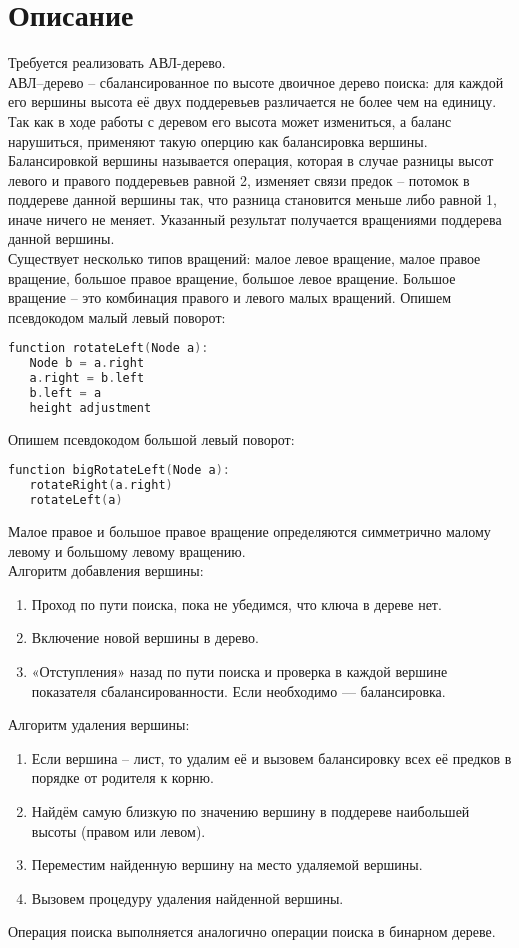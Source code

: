 \documentclass[pdf, unicode, 12pt, a4paper,oneside,fleqn]{article}
\begin{document}
\section{Описание}
Требуется реализовать АВЛ-дерево. \\ 
АВЛ--дерево -- сбалансированное по высоте двоичное дерево поиска: для каждой его вершины высота её двух поддеревьев различается не более чем на единицу\cite{wikipedia_tree}. Так как в ходе работы с деревом его высота может измениться, а баланс нарушиться, применяют такую оперцию как балансировка вершины. \\ 
Балансировкой вершины называется операция, которая в случае разницы высот левого и правого поддеревьев равной 2, изменяет связи предок -- потомок в поддереве данной вершины так, что разница становится меньше либо равной 1, иначе ничего не меняет\cite{wikipedia_tree}. Указанный результат получается вращениями поддерева данной вершины. \\
Существует несколько типов вращений: малое левое вращение, малое правое вращение, большое правое вращение, большое левое вращение. Большое вращение -- это комбинация правого и левого малых вращений.
Опишем псевдокодом малый левый поворот\cite{wikipedia_avl}:
\begin{lstlisting}[language=C++]
	function rotateLeft(Node a):
   Node b = a.right
   a.right = b.left
   b.left = a
   height adjustment
\end{lstlisting}
Опишем псевдокодом большой левый поворот\cite{wikipedia_avl}:
   \begin{lstlisting}[language=C++]
   function bigRotateLeft(Node a):
   rotateRight(a.right)
   rotateLeft(a)
\end{lstlisting}
Малое правое и большое правое вращение определяются симметрично малому левому и большому левому вращению.\\ 
Алгоритм добавления вершины\cite{wikipedia_tree}: 
\begin{enumerate}
	\item Проход по пути поиска, пока не убедимся, что ключа в дереве нет.
	\item Включение новой вершины в дерево.
	\item «Отступления» назад по пути поиска и проверка в каждой вершине показателя сбалансированности. Если необходимо — балансировка. 
\end{enumerate} 
Алгоритм удаления вершины:
\begin{enumerate}
	\item  Если вершина -- лист, то удалим её и вызовем балансировку всех её предков в порядке от родителя к корню.
	\item Найдём самую близкую по значению вершину в поддереве наибольшей высоты (правом или левом).
	\item Переместим найденную вершину на место удаляемой вершины.
	\item Вызовем процедуру удаления найденной вершины.
\end{enumerate} 
Операция поиска выполняется аналогично операции поиска в бинарном дереве.
\pagebreak
\end{document}
